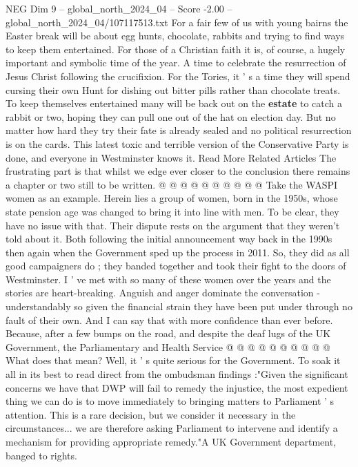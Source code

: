 \begin{textsample}{NEG Dim 9 – global\_north\_2024\_04 – Score -2.00 – global\_north\_2024\_04/107117513.txt}  \label{ex:f9_neg_223}
For a fair few of us with young bairns the Easter break will be about egg hunts, chocolate, rabbits and trying to find ways to keep them entertained.
For those of a Christian faith it is, of course, a hugely important and symbolic time of the year.
A time to celebrate the resurrection of Jesus Christ following the crucifixion.
For the Tories, it ' s a time they will spend cursing their own Hunt for dishing out bitter pills rather than chocolate treats.
To keep themselves entertained many will be back out on the \textbf{estate} to catch a rabbit or two, hoping they can pull one out of the hat on election day.
But no matter how hard they try their fate is already sealed and no political resurrection is on the cards.
This latest toxic and terrible version of the Conservative Party is done, and everyone in Westminster knows it.
Read More Related Articles The frustrating part is that whilst we edge ever closer to the conclusion there remains a chapter or two still to be written. @ @ @ @ @ @ @ @ @ @ Take the WASPI women as an example.
Herein lies a group of women, born in the 1950s, whose state pension age was changed to bring it into line with men.
To be clear, they have no issue with that.
Their dispute rests on the argument that they weren't told about it.
Both following the initial announcement way back in the 1990s then again when the Government sped up the process in 2011.
So, they did as all good campaigners do ; they banded together and took their fight to the doors of Westminster.
I ' ve met with so many of these women over the years and the stories are heart-breaking.
Anguish and anger dominate the conversation - understandably so given the financial strain they have been put under through no fault of their own.
And I can say that with more confidence than ever before.
Because, after a few bumps on the road, and despite the deaf lugs of the UK Government, the Parliamentary and Health Service @ @ @ @ @ @ @ @ @ @ What does that mean?
Well, it ' s quite serious for the Government.
To soak it all in its best to read direct from the ombudsman findings :"Given the significant concerns we have that DWP will fail to remedy the injustice, the most expedient thing we can do is to move immediately to bringing matters to Parliament ' s attention.
This is a rare decision, but we consider it necessary in the circumstances... we are therefore asking Parliament to intervene and identify a mechanism for providing appropriate remedy."A UK Government department, banged to rights.

\end{textsample}
